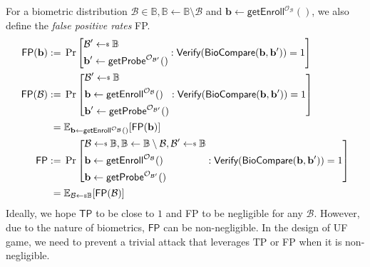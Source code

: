 For a biometric distribution $\mathcal{B} \in \mathbb{B}, \mathbb{B} \gets \mathbb{B} \setminus \mathcal{B}$ and $\mathbf{b} \gets \textsf{getEnroll}^{\mathcal{O}_\mathcal{B}}()$, we also define the \emph{false positive rates} \textsf{FP}.
\begin{align*}
	\textsf{FP}(\mathbf{b}) 
	:=&\; \Pr \left[ 
		\begin{aligned}
			& \mathcal{B}^\prime \getsdollar \mathbb{B} \\
			& \mathbf{b}^\prime \gets \textsf{getProbe}^{\mathcal{O}_{\mathcal{B}^\prime}}()
		\end{aligned}
		: \textsf{Verify}(\textsf{BioCompare}(\mathbf{b}, \mathbf{b}^\prime)) = 1 \right] \\
	\textsf{FP}(\mathcal{B}) 
	:=&\; \Pr \left[ 
		\begin{aligned}
			& \mathcal{B}^\prime \getsdollar \mathbb{B} \\
			& \mathbf{b} \gets \textsf{getEnroll}^{\mathcal{O}_\mathcal{B} }() \\
			& \mathbf{b}^\prime \gets \textsf{getProbe}^{\mathcal{O}_{\mathcal{B}^\prime} }()
		\end{aligned}
		: \textsf{Verify}(\textsf{BioCompare}(\mathbf{b}, \mathbf{b}^\prime)) = 1 \right] \\
	=&\; \mathbb{E}_{ \mathbf{b} \gets \textsf{getEnroll}^{\mathcal{O}_\mathcal{B}}() }[\textsf{FP}(\mathbf{b})] \\
	\textsf{FP} 
	:=&\; \Pr \left[
		\begin{aligned}
			& \mathcal{B} \getsdollar \mathbb{B}, \mathbb{B} \gets \mathbb{B} \setminus \mathcal{B}, \mathcal{B}^\prime \getsdollar \mathbb{B} \\
			& \mathbf{b} \gets \textsf{getEnroll}^{\mathcal{O}_\mathcal{B} }() \\
			& \mathbf{b} \gets \textsf{getProbe}^{\mathcal{O}_{\mathcal{B}^\prime} }()
		\end{aligned}
		: \textsf{Verify}(\textsf{BioCompare}(\mathbf{b}, \mathbf{b}^\prime)) = 1 \right] \\
	=&\; \mathbb{E}_{\mathcal{B} \getsdollar \mathbb{B}}[\textsf{FP}(\mathcal{B})]
\end{align*}
Ideally, we hope $\textsf{TP}$ to be close to $1$ and \textsf{FP} to be negligible for any $\mathcal{B}$. However, due to the nature of biometrics, $\textsf{FP}$ can be non-negligible. In the design of \textsf{UF} game, we need to prevent a trivial attack that leverages \textsf{TP} or \textsf{FP} when it is non-negligible.

